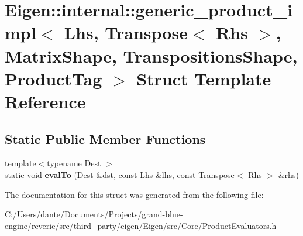 \hypertarget{struct_eigen_1_1internal_1_1generic__product__impl_3_01_lhs_00_01_transpose_3_01_rhs_01_4_00_01_7e81e525eaa34bd7c41fa1e151593e72}{}\section{Eigen\+::internal\+::generic\+\_\+product\+\_\+impl$<$ Lhs, Transpose$<$ Rhs $>$, Matrix\+Shape, Transpositions\+Shape, Product\+Tag $>$ Struct Template Reference}
\label{struct_eigen_1_1internal_1_1generic__product__impl_3_01_lhs_00_01_transpose_3_01_rhs_01_4_00_01_7e81e525eaa34bd7c41fa1e151593e72}
\subsection*{Static Public Member Functions}
\begin{DoxyCompactItemize}
\item 
\mbox{\label{struct_eigen_1_1internal_1_1generic__product__impl_3_01_lhs_00_01_transpose_3_01_rhs_01_4_00_01_7e81e525eaa34bd7c41fa1e151593e72_a0bfd245be458b4b59c333cd17a70ed06}} 
{\footnotesize template$<$typename Dest $>$ }\\static void {\bfseries eval\+To} (Dest \&dst, const Lhs \&lhs, const \mbox{\hyperlink{class_eigen_1_1_transpose}{Transpose}}$<$ Rhs $>$ \&rhs)
\end{DoxyCompactItemize}


The documentation for this struct was generated from the following file\+:\begin{DoxyCompactItemize}
\item 
C\+:/\+Users/dante/\+Documents/\+Projects/grand-\/blue-\/engine/reverie/src/third\+\_\+party/eigen/\+Eigen/src/\+Core/Product\+Evaluators.\+h\end{DoxyCompactItemize}
